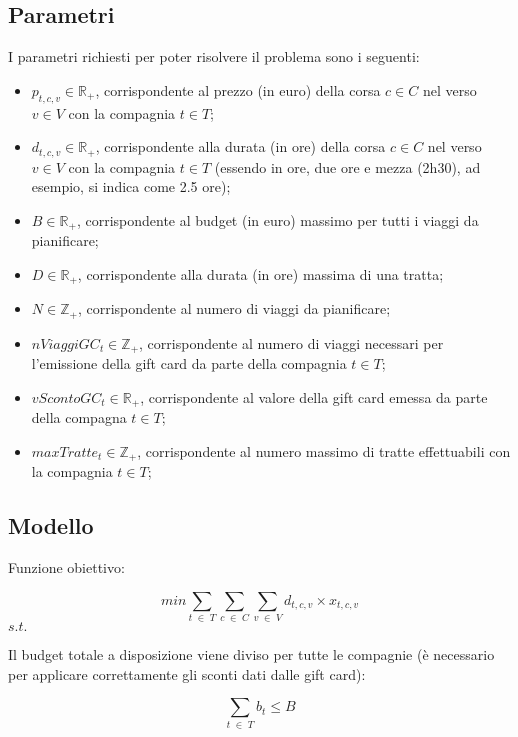 \documentclass[main.tex]{subfiles}
\begin{document}
\subsection*{Parametri}
I parametri richiesti per poter risolvere il problema sono i seguenti:
\begin{itemize}
    \item $p_{t,c,v} \in \mathbb{R}_+$, corrispondente al prezzo (in euro) della corsa $c \in C$ nel verso $v \in V$ con la compagnia $t \in T$;
    \item $d_{t,c,v} \in \mathbb{R}_+$, corrispondente alla durata (in ore) della corsa $c \in C$ nel verso $v \in V$ con la compagnia $t \in T$ (essendo in ore, due ore e mezza (2h30), ad esempio, si indica come 2.5 ore);
    \item $B \in \mathbb{R}_+$, corrispondente al budget (in euro) massimo per tutti i viaggi da pianificare;
    \item $D \in \mathbb{R}_+$, corrispondente alla durata (in ore) massima di una tratta;
    \item $N \in \mathbb{Z}_+$, corrispondente al numero di viaggi da pianificare;
    \item $nViaggiGC_t \in \mathbb{Z}_+$, corrispondente al numero di viaggi necessari per l'emissione della gift card da parte della compagnia $t \in T$;
    \item $vScontoGC_t \in \mathbb{R}_+$, corrispondente al valore della gift card emessa da parte della compagna $t \in T$;
    \item $maxTratte_t \in \mathbb{Z}_+$, corrispondente al numero massimo di tratte effettuabili con la compagnia $t \in T$;
\end{itemize}

\subsection*{Modello}
\setlength{\parindent}{0em}
Funzione obiettivo:
\begin{tcolorbox}
$$min \sum_{t\; \in\; T} \sum_{c\; \in\; C} \sum_{v\; \in\; V} d_{t,c,v} \times{} x_{t,c,v}$$
$s.t.$
\end{tcolorbox}

Il budget totale a disposizione viene diviso per tutte le compagnie (è necessario per applicare correttamente gli sconti dati dalle gift card):
\begin{tcolorbox}
$$\sum_{t\; \in\; T} b_t \leq B$$
\end{tcolorbox}
\end{document}
